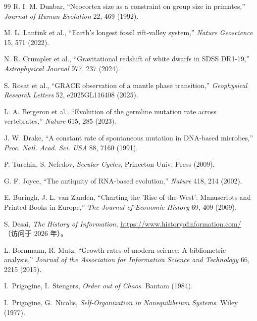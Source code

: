 \documentclass[12pt,a4paper]{article}
\theoremstyle{remark}
\begin{document}
\begin{thebibliography}{99}
			R. I. M. Dunbar, ``Neocortex size as a constraint on group size in primates,'' \emph{Journal of Human Evolution} 22, 469 (1992).
			
			M. L. Lantink et al., ``Earth's longest fossil rift-valley system,'' \emph{Nature Geoscience} 15, 571 (2022).
			
			N. R. Crumpler et al., ``Gravitational redshift of white dwarfs in SDSS DR1-19,'' \emph{Astrophysical Journal} 977, 237 (2024).
			
			S. Rosat et al., ``GRACE observation of a mantle phase transition,'' \emph{Geophysical Research Letters} 52, e2025GL116408 (2025).
			
			L. A. Bergeron et al., ``Evolution of the germline mutation rate across vertebrates,'' \emph{Nature} 615, 285 (2023).
			
			J. W. Drake, ``A constant rate of spontaneous mutation in DNA-based microbes,'' \textit{Proc. Natl. Acad. Sci. USA} 88, 7160 (1991).
			
			P. Turchin, S. Nefedov, \emph{Secular Cycles}, Princeton Univ. Press (2009).
			
			G. F. Joyce, ``The antiquity of RNA-based evolution,'' \textit{Nature} 418, 214 (2002).
			
			E. Buringh, J. L. van Zanden, ``Charting the 'Rise of the West': Manuscripts and Printed Books in Europe,'' \emph{The Journal of Economic History} 69, 409 (2009).
			
			S. Desai, \emph{The History of Information}, \url{https://www.historyofinformation.com/}（访问于 2026 年）。
			
			L. Bornmann, R. Mutz, ``Growth rates of modern science: A bibliometric analysis,'' \emph{Journal of the Association for Information Science and Technology} 66, 2215 (2015).
			
			 I.~Prigogine, I.~Stengers, \emph{Order out of Chaos}. Bantam (1984).
			
			 I.~Prigogine, G.~Nicolis, \emph{Self‑Organization in Nonequilibrium Systems}. Wiley (1977).
			
			
		\end{thebibliography}
		
		\appendix
		
\end{document}
